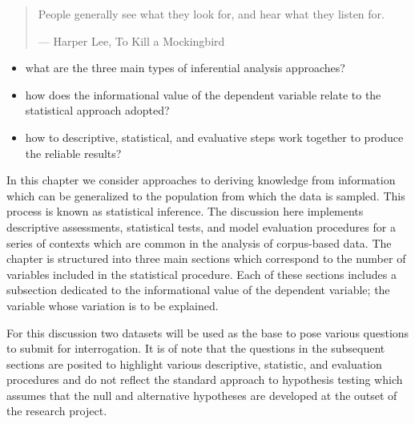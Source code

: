 \documentclass[
  letterpaper,
]{latex/krantz}
\providecommand{\tightlist}{%
  \setlength{\itemsep}{0pt}\setlength{\parskip}{0pt}}\usepackage{longtable,booktabs,array}
\begin{document}
\begin{quote}
People generally see what they look for, and hear what they listen for.

--- Harper Lee, To Kill a Mockingbird
\end{quote}

\begin{tcolorbox}[enhanced jigsaw, colframe=quarto-callout-note-color-frame, titlerule=0mm, coltitle=black, colback=white, opacitybacktitle=0.6, colbacktitle=quarto-callout-note-color!10!white, left=2mm, arc=.35mm, leftrule=.75mm, rightrule=.15mm, bottomtitle=1mm, toptitle=1mm, breakable, bottomrule=.15mm, title=\textcolor{quarto-callout-note-color}{\faInfo}\hspace{0.5em}{Keys}, toprule=.15mm, opacityback=0]

\begin{itemize}
\tightlist
\item
  what are the three main types of inferential analysis approaches?
\item
  how does the informational value of the dependent variable relate to
  the statistical approach adopted?
\item
  how to descriptive, statistical, and evaluative steps work together to
  produce the reliable results?
\end{itemize}

\end{tcolorbox}

In this chapter we consider approaches to deriving knowledge from
information which can be generalized to the population from which the
data is sampled. This process is known as statistical inference. The
discussion here implements descriptive assessments, statistical tests,
and model evaluation procedures for a series of contexts which are
common in the analysis of corpus-based data. The chapter is structured
into three main sections which correspond to the number of variables
included in the statistical procedure. Each of these sections includes a
subsection dedicated to the informational value of the dependent
variable; the variable whose variation is to be explained.

For this discussion two datasets will be used as the base to pose
various questions to submit for interrogation. It is of note that the
questions in the subsequent sections are posited to highlight various
descriptive, statistic, and evaluation procedures and do not reflect the
standard approach to hypothesis testing which assumes that the null and
alternative hypotheses are developed at the outset of the research
project.
\end{document}

